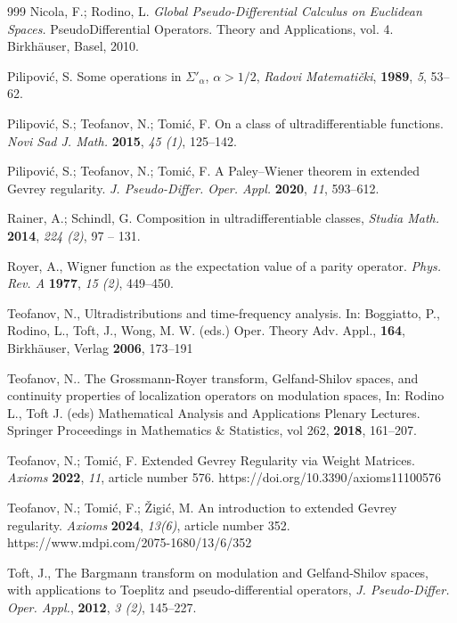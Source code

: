 \documentclass{article}
\theoremstyle{thmstyleone}
\theoremstyle{thmstyletwo}%
\theoremstyle{thmstylethree}%
\begin{document}
\begin{thebibliography}{999}
Nicola, F.; Rodino, L.
\textit{Global Pseudo-Differential Calculus on Euclidean Spaces.} PseudoDifferential Operators. Theory and Applications, vol. 4. Birkh\"auser, Basel, 2010.

 Pilipovi\'c, S.
Some operations in $\Sigma'_\alpha$, $\alpha>1/2$, {\em Radovi Matemati\v cki}, {\bf 1989}, {\em 5}, 53--62.

 Pilipovi\'c, S.; Teofanov, N.;  Tomi\'c, F.
On a class of ultradifferentiable functions.
{\em Novi Sad J. Math.} {\bf 2015}, {\em 45 (1)}, 125--142.

 Pilipovi\'c, S.; Teofanov, N.; Tomi\'c, F.
A Paley--Wiener theorem in extended Gevrey regularity.
{\em J. Pseudo-Differ. Oper. Appl.} {\bf 2020}, {\em 11}, 593--612.


 Rainer, A.; Schindl, G.
Composition in ultradifferentiable classes,
{\em  Studia Math.} {\bf 2014}, {\em 224 (2)}, 97 -- 131.

  Royer, A.,
Wigner function as the expectation value of a parity operator.
{\em Phys. Rev. A}  {\bf 1977}, {\em 15 (2)}, 449--450.


 Teofanov, N., Ultradistributions and time-frequency analysis. In:
Boggiatto, P., Rodino, L., Toft, J., Wong, M. W. (eds.)
Oper. Theory Adv. Appl., \textbf{164},
Birkh\"auser, Verlag {\bf 2006}, 173--191

 Teofanov, N..
The Grossmann-Royer transform, Gelfand-Shilov spaces, and continuity properties of localization operators on modulation spaces, In: Rodino L., Toft J. (eds) Mathematical Analysis and Applications Plenary Lectures. Springer Proceedings in Mathematics $\&$ Statistics, vol 262, {\bf 2018}, 161--207.

 Teofanov, N.; Tomić, F. Extended Gevrey Regularity via Weight Matrices. {\em Axioms} {\bf 2022}, {\em 11},  article number 576. https://doi.org/10.3390/axioms11100576 

 Teofanov, N.; Tomi\'c, F.; \v Zigi\'c, M.
An introduction to extended Gevrey regularity.
{\em Axioms} {\bf 2024}, {\em 13(6)}, article number 352.
https://www.mdpi.com/2075-1680/13/6/352


Toft, J.,
The Bargmann transform on modulation and Gelfand-Shilov spaces,
with applications to Toeplitz and pseudo-differential operators,
{\em J. Pseudo-Differ. Oper. Appl.}, {\bf 2012}, {\em 3 (2)},
145--227.






\end{thebibliography}
\end{document}
